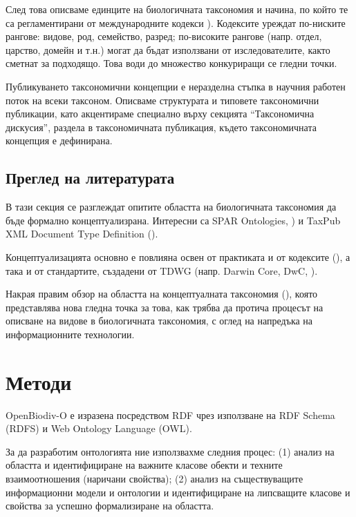 След това описваме единците на биологичната таксономия и начина, по който те са регламентирани от международните кодекси \cite{international_commission_on_zoological_nomenclature_international_1999, noauthor_international_2012}). Кодексите уреждат по-ниските рангове: видове, род, семейство, разред; по-високите рангове (напр. отдел, царство, домейн и т.н.) могат да бъдат използвани от изследователите, както сметнат за подходящо. Това води до множество конкуриращи се гледни точки.

Публикуването таксономични концепции е неразделна стъпка в научния работен поток на всеки таксоном. Описваме структурата и типовете таксономични публикации, като акцентираме специално върху секцията ``Таксономична дискусия'', раздела в таксономичната публикация, където таксономичната концепция е дефинирана.

\subsection*{Преглед на литературата}

В тази секция се разглеждат опитите областта на биологичната таксономия да бъде формално концептуализрана.  Интересни са SPAR Ontologies, \cite{peroni_semantic_2014}) и TaxPub XML Document Type Definition (\cite{catapano_taxpub:_2010}).

Концептуализацията основно е повлияна освен от практиката и от кодексите (\cite{international_commission_on_zoological_nomenclature_international_1999,noauthor_international_2012}), а така и от стандартите, създадени от TDWG (напр. Darwin Core, DwC, \cite{wieczorek_darwin_2012}).

Накрая правим обзор на областта на концептуалната таксономия (\cite{berendsohn_concept_1995, franz_perspectives:_2009,sterner_taxonomy_2017}), която представлява нова гледна точка за това, как трябва да протича процесът на описване на видове в биологичната таксономия, с оглед на напредъка на информационните технологии.

\section{Методи}

OpenBiodiv-O е изразена посредством RDF чрез използване на RDF Schema (RDFS) и Web Ontology Language (OWL).

За да разработим онтологията ние използвахме следния процес: (1) анализ на областта и идентифициране на важните класове обекти и техните взаимоотношения (наричани свойства); (2) анализ на съществуващите информационни модели и онтологии и идентифициране на липсващите класове и свойства за успешно формализиране на областта.

